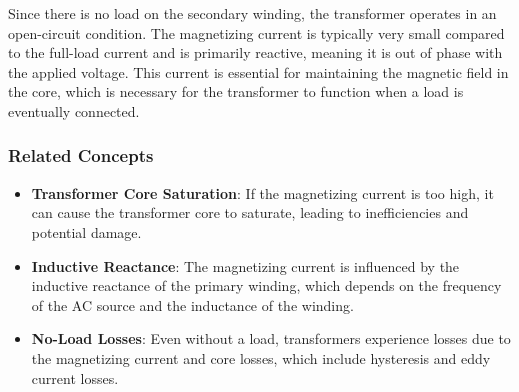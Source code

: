 Since there is no load on the secondary winding, the transformer operates in an open-circuit condition. The magnetizing current is typically very small compared to the full-load current and is primarily reactive, meaning it is out of phase with the applied voltage. This current is essential for maintaining the magnetic field in the core, which is necessary for the transformer to function when a load is eventually connected.

\subsubsection{Related Concepts}
\begin{itemize}
    \item \textbf{Transformer Core Saturation}: If the magnetizing current is too high, it can cause the transformer core to saturate, leading to inefficiencies and potential damage.
    \item \textbf{Inductive Reactance}: The magnetizing current is influenced by the inductive reactance of the primary winding, which depends on the frequency of the AC source and the inductance of the winding.
    \item \textbf{No-Load Losses}: Even without a load, transformers experience losses due to the magnetizing current and core losses, which include hysteresis and eddy current losses.
\end{itemize}

